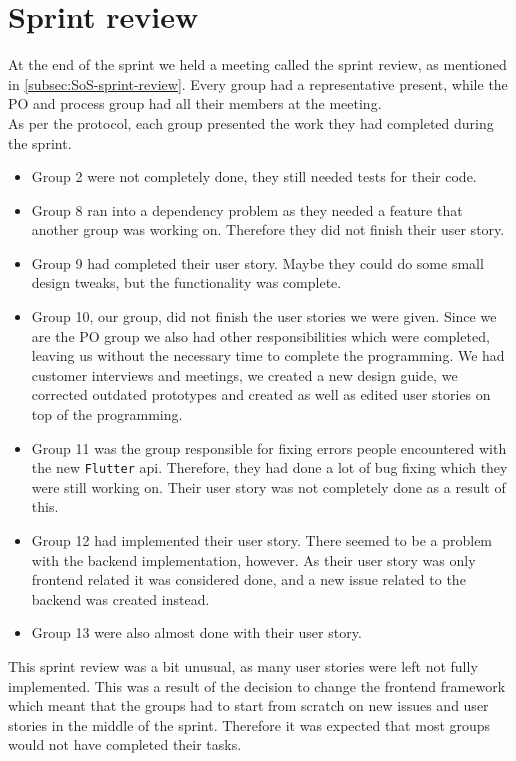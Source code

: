 \section{Sprint review}
At the end of the sprint we held a meeting called the sprint review, as mentioned in \autoref{subsec:SoS-sprint-review}.
Every group had a representative present, while the PO  and process group had all their members at the meeting.
\\
As per the protocol, each group presented the work they had completed during the sprint.
\begin{itemize}
    \item Group 2 were not completely done, they still needed tests for their code.
    \item Group 8 ran into a dependency problem as they needed a feature that another group was working on. Therefore they did not finish their user story.
    \item Group 9 had completed their user story. Maybe they could do some small design tweaks, but the functionality was complete.
    \item Group 10, our group, did not finish the user stories we were given. Since we are the PO group we also had other responsibilities which were completed, leaving us without the necessary time to complete the programming. We had customer interviews and meetings, we created a new design guide, we corrected outdated prototypes and created as well as edited user stories on top of the programming.
    \item Group 11 was the group responsible for fixing errors people encountered with the new \texttt{Flutter} api. Therefore, they had done a lot of bug fixing which they were still working on. Their user story was not completely done as a result of this.
    \item Group 12 had implemented their user story. There seemed to be a problem with the backend implementation, however. As their user story was only frontend related it was considered done, and a new issue related to the backend was created instead.
    \item Group 13 were also almost done with their user story.
\end{itemize}
\noindent
This sprint review was a bit unusual, as many user stories were left not fully implemented. This was a result of the decision to change the frontend framework which meant that the groups had to start from scratch on new issues and user stories in the middle of the sprint.
Therefore it was expected that most groups would not have completed their tasks.

